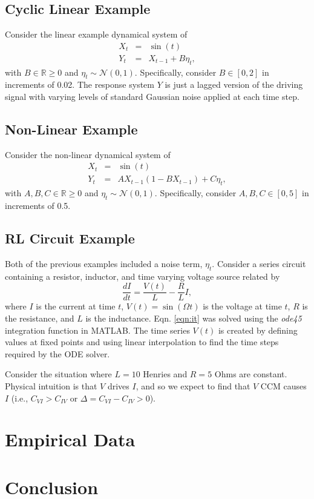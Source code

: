 \documentclass[twocolumn,aps,pre,groupedaddress]{revtex4-1}
\begin{document}
\subsection{Cyclic Linear Example}
Consider the linear example dynamical system of
\begin{eqnarray}
\label{eq:linearex}
X_t &=& \sin(t)\\
Y_t &=& X_{t-1}+B\eta_t,
\end{eqnarray}
with $B\in\mathbb{R}\ge 0$ and $\eta_t\sim\mathcal{N}\left(0,1\right)$.  Specifically, consider $B\in[0,2]$ in increments of 0.02.  The response system $Y$ is just a lagged version of the driving signal with varying levels of standard Gaussian noise applied at each time step.  

\subsection{Non-Linear Example}
Consider the non-linear dynamical system of
\begin{eqnarray}
\label{eqn:nonlinearEX}
X_t &=& \sin(t)\\
Y_t &=& AX_{t-1}\left(1-BX_{t-1}\right)+C\eta_t,
\end{eqnarray}
with $A,B,C\in\mathbb{R}\ge 0$ and $\eta_t\sim\mathcal{N}\left(0,1\right)$.  Specifically, consider $A,B,C\in[0,5]$ in increments of 0.5.  

\subsection{RL Circuit Example}
\label{sec:rlcirc}
Both of the previous examples included a noise term, $\eta_t$.  Consider a series circuit containing a resistor, inductor, and time varying voltage source related by
\begin{equation}
\label{eqn:it}
\frac{dI}{dt} = \frac{V(t)}{L} - \frac{R}{L} I,
\end{equation}
where $I$ is the current at time $t$, $V(t)= \sin\left(\Omega t\right)$ is the voltage at time $t$, $R$ is the resistance, and $L$ is the inductance.  Eqn. \ref{eqn:it} was solved using the {\em ode45} integration function in MATLAB.  The time series $V(t)$ is created by defining values at fixed points and using linear interpolation to find the time steps required by the ODE solver.  

Consider the situation where $L=10$ Henries and $R=5$ Ohms are constant.  Physical intuition is that $V$ drives $I$, and so we expect to find that $V$ CCM causes $I$ (i.e., $C_{VI}>C_{IV}$ or $\Delta = C_{VI}-C_{IV} > 0$). 


\section{Empirical Data}

\section{Conclusion}

%
%
\end{document}
